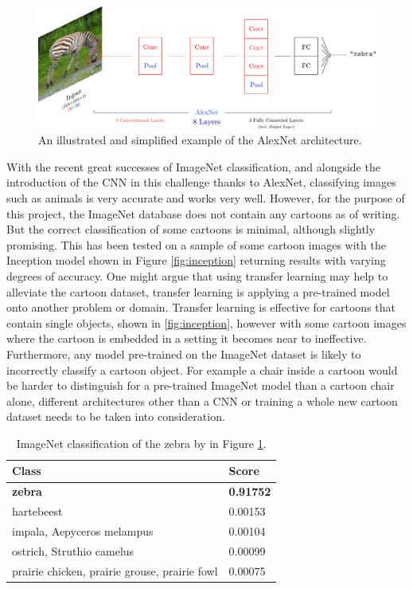 \documentclass[report, 11pt, oneside]{dissertation}
\begin{document}
\begin{figure}[!htb]
	\centering
	\includegraphics[scale=0.55]{figure_14.pdf}
	\caption[AlexNet architecture.]{An illustrated and simplified example of the AlexNet architecture.}
	\label{fig:alexnet}
\end{figure}


With the recent great successes of ImageNet classification, and alongside the introduction of the CNN in this challenge thanks to AlexNet, classifying images such as animals is very accurate and works very well. However, for the purpose of this project, the ImageNet database does not contain any cartoons as of writing. But the correct classification of some cartoons is minimal, although slightly promising. This has been tested on a sample of some cartoon images with the Inception model shown in Figure \ref{fig:inception} returning results with varying degrees of accuracy. One might argue that using transfer learning may help to alleviate the cartoon dataset, transfer learning is applying a pre-trained model onto another problem or domain. Transfer learning is effective for cartoons that contain single objects, shown in \ref{fig:inception}, however with some cartoon images where the cartoon is embedded in a setting it becomes near to ineffective. Furthermore, any model pre-trained on the ImageNet dataset is likely to incorrectly classify a cartoon object. For example a chair inside a cartoon would be harder to distinguish for a pre-trained ImageNet model than a cartoon chair alone, different architectures other than a CNN or training a whole new cartoon dataset needs to be taken into consideration.

\begin{table}[]
	\centering
	\begin{tabular}{|l|l|}
	\hline
	Class                                         & Score            \\ \hline
	\textbf{zebra}                                & \textbf{0.91752} \\ \hline
	hartebeest                                    & 0.00153          \\ \hline
	impala, Aepyceros melampus                    & 0.00104          \\ \hline
	ostrich, Struthio camelus                     & 0.00099          \\ \hline
	prairie chicken, prairie grouse, prairie fowl & 0.00075          \\ \hline
	\end{tabular}
	\caption{ImageNet classification of the zebra by \citep{randomlists.com} in Figure \ref{fig:alexnet}.}
	\label{tab:zebra_results}
\end{table}
\end{document}
